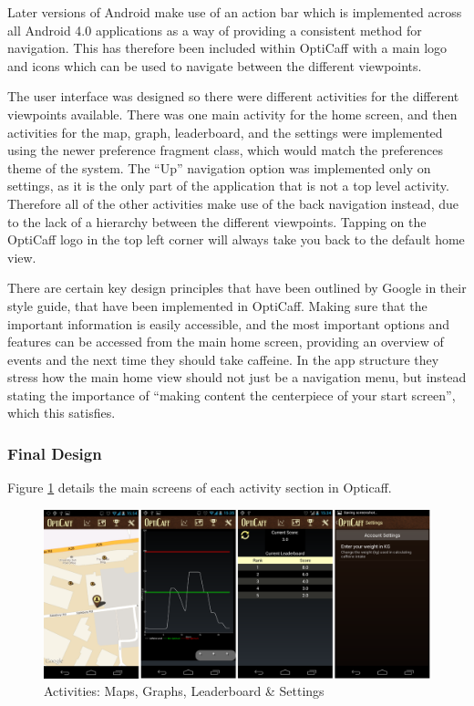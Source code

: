 Later versions of Android make use of an action bar which is implemented across all Android 4.0 applications as a way of providing a consistent method for navigation. This has therefore been included within OptiCaff with a main logo and icons which can be used to navigate between the different viewpoints.
                   
The user interface was designed so there were different activities for the different viewpoints available. There was one main activity for the home screen, and then activities for the map, graph, leaderboard, and the settings were implemented using the newer preference fragment class, which would match the preferences theme of the system. The ``Up” navigation option was implemented only on settings, as it is the only part of the application that is not a top level activity. Therefore all of the other activities make use of the back navigation instead, due to the lack of a hierarchy between the different viewpoints. Tapping on the OptiCaff logo in the top left corner will always take you back to the default home view.
                   
There are certain key design principles that have been outlined by Google in their style guide, that have been implemented in OptiCaff. Making sure that the important information is easily accessible, and the most important options and features can be accessed from the main home screen, providing an overview of events and the next time they should take caffeine. In the app structure they stress how the main home view should not just be a navigation menu, but instead stating the importance of ``making content the centerpiece of your start screen”, which this satisfies.       
                   
\subsubsection{Final Design}
                   
Figure \ref{fig:Activities} details the main screens of each activity section in Opticaff.
                   
\begin{figure}[ht]
\begin{center}
\includegraphics[scale=0.23]{images/app.png}
\caption{Activities: Maps, Graphs, Leaderboard \& Settings} 
\label{fig:Activities}
\end{center}
\end{figure}


